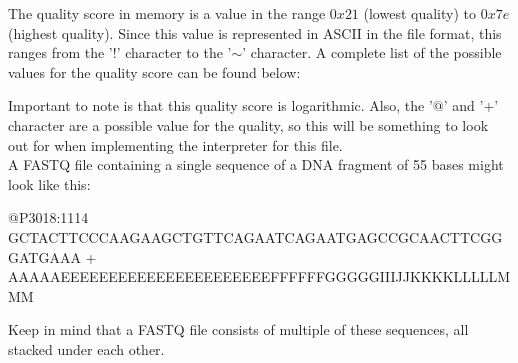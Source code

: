 The quality score in memory is a value in the range $0x21$ (lowest quality) to $0x7e$ (highest quality). Since this value is represented in ASCII in the file format, this ranges from the '$!$' character to the '$\mathtt{\sim}$' character. A complete list of the possible values for the quality score can be found below:

\begin{lcverbatim}
!"#$%
[\]^_`abcdefghijklmnopqrstuvwxyz{|}~
\end{lcverbatim}


Important to note is that this quality score is logarithmic. Also, the '$@$' and '$+$' character are a possible value for the quality, so this will be something to look out for when implementing the interpreter for this file.\\

	
A FASTQ file containing a single sequence of a DNA fragment of 55 bases might look like this:


\begin{lcverbatim}
@P3018:1114
GCTACTTCCCAAGAAGCTGTTCAGAATCAGAATGAGCCGCAACTTCGGGATGAAA
+
AAAAAEEEEEEEEEEEEEEEEEEEEEEFFFFFFGGGGGIIIJJKKKKLLLLLMMM
\end{lcverbatim}

Keep in mind that a FASTQ file consists of multiple of these sequences, all stacked under each other.
	
	
